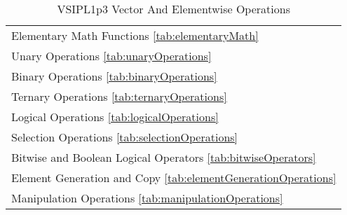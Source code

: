 \begin{table}[H]
\caption{VSIPL1p3 Vector And Elementwise Operations}
\label{tab:elementwiseChapter}
\begin{center}
\begin{tabular}{|l|}\hline
Elementary Math Functions \ref{tab:elementaryMath}\\
Unary Operations \ref{tab:unaryOperations}\\
Binary Operations \ref{tab:binaryOperations}\\
Ternary Operations \ref{tab:ternaryOperations}\\
Logical Operations \ref{tab:logicalOperations}\\
Selection Operations \ref{tab:selectionOperations}\\
Bitwise and Boolean Logical Operators \ref{tab:bitwiseOperators}\\
Element Generation and Copy \ref{tab:elementGenerationOperations}\\
Manipulation Operations \ref{tab:manipulationOperations}\\
\hline\end{tabular}
\end{center}
\label{default}
\end{table}%